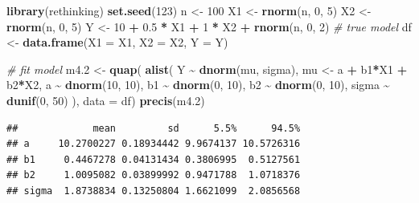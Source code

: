 \documentclass[
]{book}
\newenvironment{Shaded}{\begin{snugshade}}{\end{snugshade}}
\newcommand{\AttributeTok}[1]{\textcolor[rgb]{0.13,0.29,0.53}{#1}}
\newcommand{\CommentTok}[1]{\textcolor[rgb]{0.56,0.35,0.01}{\textit{#1}}}
\newcommand{\DecValTok}[1]{\textcolor[rgb]{0.00,0.00,0.81}{#1}}
\newcommand{\FloatTok}[1]{\textcolor[rgb]{0.00,0.00,0.81}{#1}}
\newcommand{\FunctionTok}[1]{\textcolor[rgb]{0.13,0.29,0.53}{\textbf{#1}}}
\newcommand{\NormalTok}[1]{#1}
\newcommand{\OtherTok}[1]{\textcolor[rgb]{0.56,0.35,0.01}{#1}}
\newcommand{\SpecialCharTok}[1]{\textcolor[rgb]{0.81,0.36,0.00}{\textbf{#1}}}
\begin{document}
\begin{Shaded}
\begin{Highlighting}[]
\FunctionTok{library}\NormalTok{(rethinking)}
\FunctionTok{set.seed}\NormalTok{(}\DecValTok{123}\NormalTok{)}
\NormalTok{n }\OtherTok{\textless{}{-}} \DecValTok{100}
\NormalTok{X1 }\OtherTok{\textless{}{-}} \FunctionTok{rnorm}\NormalTok{(n, }\DecValTok{0}\NormalTok{, }\DecValTok{5}\NormalTok{)}
\NormalTok{X2 }\OtherTok{\textless{}{-}} \FunctionTok{rnorm}\NormalTok{(n, }\DecValTok{0}\NormalTok{, }\DecValTok{5}\NormalTok{)}
\NormalTok{Y }\OtherTok{\textless{}{-}} \DecValTok{10} \SpecialCharTok{+} \FloatTok{0.5} \SpecialCharTok{*}\NormalTok{ X1 }\SpecialCharTok{+} \DecValTok{1} \SpecialCharTok{*}\NormalTok{ X2 }\SpecialCharTok{+} \FunctionTok{rnorm}\NormalTok{(n, }\DecValTok{0}\NormalTok{, }\DecValTok{2}\NormalTok{) }\CommentTok{\# true model}
\NormalTok{df }\OtherTok{\textless{}{-}} \FunctionTok{data.frame}\NormalTok{(}\AttributeTok{X1 =}\NormalTok{ X1, }\AttributeTok{X2 =}\NormalTok{ X2, }\AttributeTok{Y =}\NormalTok{ Y)}

\CommentTok{\# fit model}
\NormalTok{m4}\FloatTok{.2} \OtherTok{\textless{}{-}} \FunctionTok{quap}\NormalTok{(}
  \FunctionTok{alist}\NormalTok{(}
\NormalTok{    Y }\SpecialCharTok{\textasciitilde{}} \FunctionTok{dnorm}\NormalTok{(mu, sigma),}
\NormalTok{    mu }\OtherTok{\textless{}{-}}\NormalTok{ a }\SpecialCharTok{+}\NormalTok{ b1}\SpecialCharTok{*}\NormalTok{X1 }\SpecialCharTok{+}\NormalTok{ b2}\SpecialCharTok{*}\NormalTok{X2,}
\NormalTok{    a }\SpecialCharTok{\textasciitilde{}} \FunctionTok{dnorm}\NormalTok{(}\DecValTok{10}\NormalTok{, }\DecValTok{10}\NormalTok{),}
\NormalTok{    b1 }\SpecialCharTok{\textasciitilde{}} \FunctionTok{dnorm}\NormalTok{(}\DecValTok{0}\NormalTok{, }\DecValTok{10}\NormalTok{),}
\NormalTok{    b2 }\SpecialCharTok{\textasciitilde{}} \FunctionTok{dnorm}\NormalTok{(}\DecValTok{0}\NormalTok{, }\DecValTok{10}\NormalTok{),}
\NormalTok{    sigma }\SpecialCharTok{\textasciitilde{}} \FunctionTok{dunif}\NormalTok{(}\DecValTok{0}\NormalTok{, }\DecValTok{50}\NormalTok{)}
\NormalTok{  ), }\AttributeTok{data =}\NormalTok{ df)}
\FunctionTok{precis}\NormalTok{(m4}\FloatTok{.2}\NormalTok{)}
\end{Highlighting}
\end{Shaded}

\begin{verbatim}
##             mean         sd      5.5%      94.5%
## a     10.2700227 0.18934442 9.9674137 10.5726316
## b1     0.4467278 0.04131434 0.3806995  0.5127561
## b2     1.0095082 0.03899992 0.9471788  1.0718376
## sigma  1.8738834 0.13250804 1.6621099  2.0856568
\end{verbatim}
\end{document}
